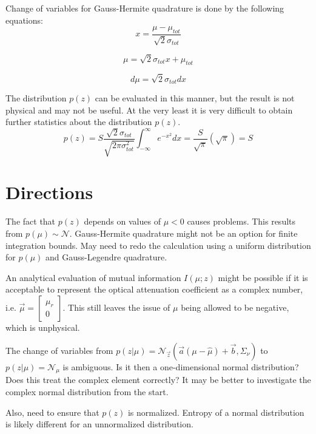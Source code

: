\documentclass{article}         %
\theoremstyle{definition}
\theoremstyle{remark}
\begin{document}
Change of variables for Gauss-Hermite quadrature is done by the following equations:
\begin{equation}
	x = \frac{\mu - \mu_{tot}}{\sqrt{2}\sigma_{tot}}
\end{equation}

\begin{equation}
	\mu = \sqrt{2}\sigma_{tot}x + \mu_{tot}
\end{equation}

\begin{equation}
	d\mu = \sqrt{2}\sigma_{tot}dx
\end{equation}

The distribution $p\left(z\right)$ can be evaluated in this manner, but the result is not physical and may not be useful. At the very least it is very difficult to obtain further statistics about the distribution $p\left(z\right)$.
\begin{equation}
	p\left(z\right) = S\frac{\sqrt{2}\sigma_{tot}}{\sqrt{2\pi\sigma_{tot}^2}}\int_{-\infty}^\infty e^{-x^2}dx = \frac{S}{\sqrt{\pi}}\left(\sqrt{\pi}\right) = S
\end{equation}

\section{Directions}\label{Directions}

The fact that $p\left(z\right)$ depends on values of $\mu < 0$ causes problems. This results from $p\left(\mu\right)\sim\mathcal{N}$. Gauss-Hermite quadrature might not be an option for finite integration bounds. May need to redo the calculation using a uniform distribution for $p\left(\mu\right)$ and Gauss-Legendre quadrature.

An analytical evaluation of mutual information $I\left(\mu;z\right)$ might be possible if it is acceptable to represent the optical attenuation coefficient as a complex number, i.e. $\vec{\mu} = \left[ \begin{array}{c} \mu_r \\ 0 \end{array} \right]$. This still leaves the issue of $\mu$ being allowed to be negative, which is unphysical.

The change of variables from $p\left(z|\mu\right) = \mathcal{N}_{\vec{z}}\left(\vec{a}\left(\mu-\hat{\mu}\right)+\vec{b},\Sigma_\nu\right)$ to $p\left(z|\mu\right) = \mathcal{N}_\mu$ is ambiguous. Is it then a one-dimensional normal distribution? Does this treat the complex element correctly? It may be better to investigate the complex normal distribution from the start.

Also, need to ensure that $p\left(z\right)$ is normalized. Entropy of a normal distribution is likely different for an unnormalized distribution.
\end{document}
